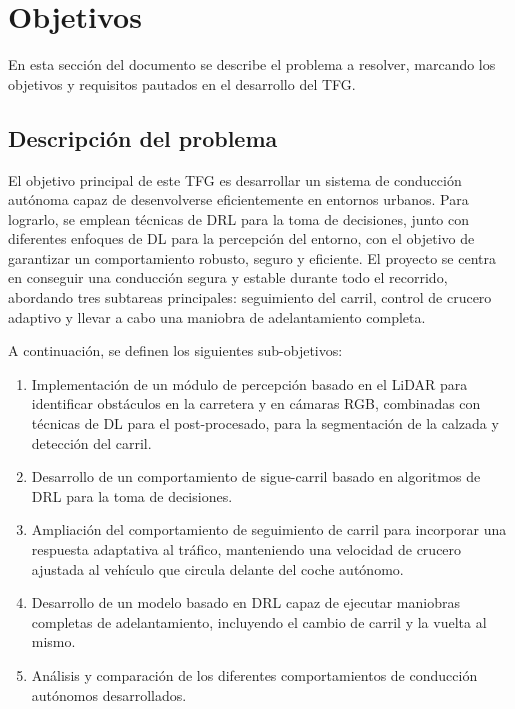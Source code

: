 \chapter{Objetivos}
\label{cap:capitulo2}

En esta sección del documento se describe el problema a resolver, marcando los objetivos y requisitos pautados en el desarrollo del \ac{TFG}.

\section{Descripción del problema}
\label{sec:descripcion}

El objetivo principal de este \ac{TFG} es desarrollar un sistema de conducción autónoma capaz de desenvolverse eficientemente en entornos urbanos. Para lograrlo, se emplean técnicas de \ac{DRL} para la toma de decisiones, junto con diferentes enfoques de \ac{DL} para la percepción del entorno, con el objetivo de garantizar un comportamiento robusto, seguro y eficiente. El proyecto se centra en conseguir una conducción segura y estable durante todo el recorrido, abordando tres subtareas principales: seguimiento del carril, control de crucero adaptivo y llevar a cabo una maniobra de adelantamiento completa.

A continuación, se definen los siguientes sub-objetivos: 

\begin{enumerate}
\item Implementación de un módulo de percepción basado en el \ac{LiDAR} para identificar obstáculos en la carretera y en cámaras RGB, combinadas con técnicas de \ac{DL} para el post-procesado, para la segmentación de la calzada y detección del carril.
\item Desarrollo de un comportamiento de sigue-carril basado en algoritmos de \ac{DRL} para la toma de decisiones.
\item Ampliación del comportamiento de seguimiento de carril para incorporar una respuesta adaptativa al tráfico, manteniendo una velocidad de crucero ajustada al vehículo que circula delante del coche autónomo.
\item Desarrollo de un modelo basado en \ac{DRL} capaz de ejecutar maniobras completas de adelantamiento, incluyendo el cambio de carril y la vuelta al mismo.
\item Análisis y comparación de los diferentes comportamientos de conducción autónomos desarrollados.
\end{enumerate}

